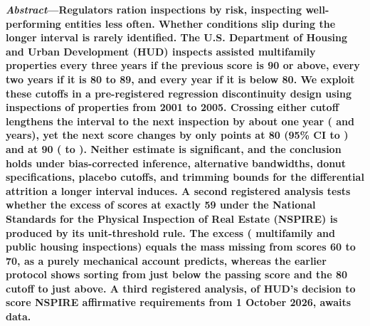 \documentclass[10pt,twocolumn,letterpaper]{article}
\begin{document}

\begingroup
\renewcommand{\thefootnote}{}
\endgroup

\noindent\textbf{\textit{Abstract}---Regulators ration inspections by risk, inspecting well-performing entities less often. Whether conditions slip during the longer interval is rarely identified. The U.S. Department of Housing and Urban Development (HUD) inspects assisted multifamily properties every three years if the previous score is 90 or above, every two years if it is 80 to 89, and every year if it is below 80. We exploit these cutoffs in a pre-registered regression discontinuity design using \nIndex{} inspections of \nIndexProps{} properties from 2001 to 2005. Crossing either cutoff lengthens the interval to the next inspection by about one year (\fsEighty{} and \fsNinety{} years), yet the next score changes by only \jumpEighty{} points at 80 (95\% CI \ciLoEighty{} to \ciHiEighty) and \jumpNinety{} at 90 (\ciLoNinety{} to \ciHiNinety). Neither estimate is significant, and the conclusion holds under bias-corrected inference, alternative bandwidths, donut specifications, placebo cutoffs, and trimming bounds for the differential attrition a longer interval induces. A second registered analysis tests whether the excess of scores at exactly 59 under the National Standards for the Physical Inspection of Real Estate (NSPIRE) is produced by its unit-threshold rule. The excess (\excMf{} multifamily and \excPh{} public housing inspections) equals the mass missing from scores 60 to 70, as a purely mechanical account predicts, whereas the earlier protocol shows sorting from just below the passing score and the 80 cutoff to just above. A third registered analysis, of HUD's decision to score NSPIRE affirmative requirements from 1 October 2026, awaits data.}
\end{document}
